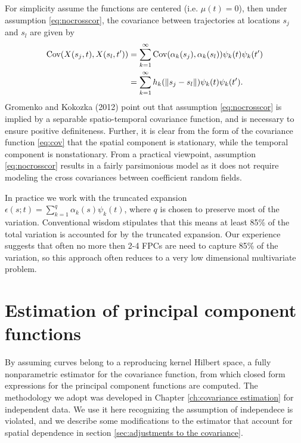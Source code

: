 For simplicity assume the functions are centered (i.e. $\mu(t)=0$), then under assumption \eqref{eq:nocrosscor}, the covariance between trajectories at locations $s_j$ and $s_l$ are given by 
\begin{align}
	\text{Cov}(X(s_j,t), X(s_l, t')) &= \sum_{k=1}^{\infty}\text{Cov}(\alpha_k(s_j), \alpha_k(s_l))\psi_k(t)\psi_k(t')\\
	&= \sum_{k=1}^{\infty}h_k(\left\|s_j-s_l\right\|)\psi_k(t)\psi_k(t'). \label{eq:cov} 
\end{align}
Gromenko and Kokozka (2012) point out that assumption \eqref{eq:nocrosscor} is implied by a separable spatio-temporal covariance function, and is necessary to ensure positive definiteness. Further, it is clear from the form of the covariance function \eqref{eq:cov} that the spatial component is stationary, while the temporal component is nonstationary. From a practical viewpoint, assumption \ref{eq:nocrosscor} results in a fairly parsimonious model as it does not require modeling the cross covariances between coefficient random fields. 

In practice we work with the truncated expansion $\epsilon(s;t) = \sum_{k=1}^{q} \alpha_k(s)\psi_k(t)$, where $q$ is chosen to preserve most of the variation. Conventional wisdom stipulates that this means at least 85\% of the total variation is accounted for by the truncated expansion. Our experience suggests that often no more then 2-4 FPCs are need to capture 85\% of the variation, so this approach often reduces to a very low dimensional multivariate problem. 



\section{Estimation of principal component functions} 

\label{sec:eigenfunction_estimation} By assuming curves belong to a reproducing kernel Hilbert space, a fully nonparametric estimator for the covariance function, from which closed form expressions for the principal component functions are computed. The methodology we adopt was developed in Chapter \ref{ch:covariance estimation} for independent data. We use it here recognizing the assumption of independece is violated, and we describe some modifications to the estimator that account for spatial dependence in section \ref{sec:adjustments to the covariance}.

